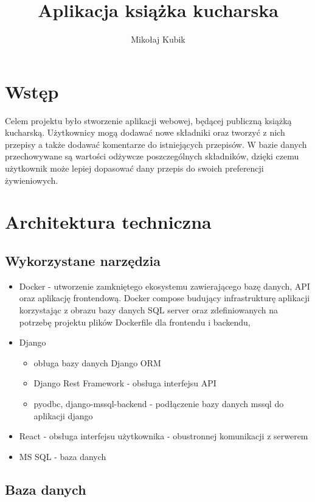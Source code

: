 \documentclass[11pt]{article}
\title{Aplikacja książka kucharska}
\author{Mikołaj Kubik}
\begin{document}
\maketitle
\section{Wstęp}
Celem projektu było stworzenie aplikacji webowej, będącej publiczną książką kucharską. Użytkownicy mogą dodawać nowe składniki
oraz tworzyć z nich przepisy a także dodawać komentarze do istniejących przepisów. W bazie danych przechowywane są wartości 
odżywcze poszczególnych składników, dzięki czemu użytkownik może lepiej dopasować dany przepis do swoich preferencji żywieniowych.

\section{Architektura techniczna}
\subsection{Wykorzystane narzędzia}
\begin{itemize}
    \item Docker -  utworzenie zamkniętego ekosystemu zawierającego bazę danych, API oraz aplikację frontendową. Docker compose budujący infrastrukturę aplikacji korzystając z obrazu bazy danych SQL server oraz zdefiniowanych na potrzebę projektu plików Dockerfile dla frontendu i backendu,
    \item Django 
    \begin{itemize}
        \item obługa bazy danych Django ORM
        \item Django Rest Framework - obsługa interfejsu API
        \item pyodbc, django-mssql-backend - podłączenie bazy danych mssql do aplikacji django
    \end{itemize}
    \item React - obsługa interfejsu użytkownika - obustronnej komunikacji z serwerem
    \item MS SQL - baza danych
\end{itemize}
\subsection{Baza danych}
\end{document}
